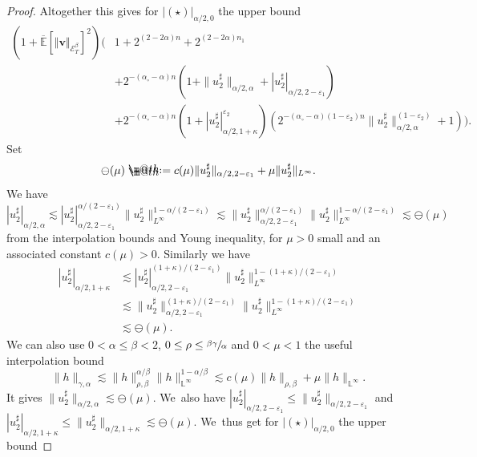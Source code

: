 \documentclass[JEP,XML,SOM,Unicode,published]{cedram}
\makeatletter
\theoremstyle{definition}
\let\epsilon\varepsilon
\newcommand\bbE{\mathbb{E}}
\newcommand{\mcE}{\mathcal{E}}
\newcommand{\bsv}{\boldsymbol{v}}
\newcommand*{\defeq}{\mathrel{\rlap{%
\raisebox{0.3ex}{$\m@th\cdot$}}%
\raisebox{-0.3ex}{$\m@th\cdot$}}%
=}
\newcommand{\norme}[1]{\Vert #1 \Vert}
\makeatother
\begin{document}
\begin{proof}
Altogether this gives for $| (\star) |_{\alpha / 2, 0}$ the upper bound
\begin{align*}
(1+ \overline{\bbE}[\norme{\bsv}_{\mcE^\beta_T}]^2)\bigl( &1 + 2^{(2 - 2 \alpha) n} + 2^{(2 - 2 \alpha) n_1}
\\
& + 2^{- (\alpha_{\circ} - \alpha) n} (1 + \| u^{\sharp}_2 \|_{\alpha
/ 2, \alpha} + | u_2^{\sharp} |_{\alpha / 2, 2 - \epsilon_1})
\\
& + 2^{- (\alpha_{\circ} - \alpha) n} (1 + |
u_2^{\sharp} |^{\epsilon_2}_{\alpha / 2, 1 + \kappa}) (2^{-
(\alpha_{\circ} - \alpha) (1 - \epsilon_2) n} \| u_2^{\sharp} \|^{(1 -
\epsilon_2)}_{\alpha / 2, \alpha} + 1) \bigr).
\end{align*}
Set
\[
\ominus (\mu) \defeq c (\mu) \| u_2^{\sharp} \|_{\alpha / 2, 2 -
\epsilon_1} + \mu \| u_2^{\sharp} \|_{L^{\infty}}.
\]
We have
\[
| u_2^{\sharp} |_{\alpha / 2, \alpha} \lesssim | u_2^{\sharp} |_{\alpha /
2, 2 - \epsilon_1}^{\alpha / (2 - \epsilon_1)} \| u_2^{\sharp}
\|_{L^{\infty}}^{1 - \alpha / (2 - \epsilon_1)}\lesssim \|
u_2^{\sharp} \|_{\alpha / 2, 2 - \epsilon_1}^{\alpha / (2 - \epsilon_1)}
\| u_2^{\sharp} \|_{L^{\infty}}^{1 - \alpha / (2 - \epsilon_1)} \lesssim
\ominus (\mu)
\]
from the interpolation bounds and Young inequality, for $\mu > 0$ small and an associated constant $c (\mu) > 0$. Similarly we have
\begin{equation*} \begin{split}
| u_2^{\sharp} |_{\alpha / 2, 1 + \kappa} &\lesssim
| u_2^{\sharp} |_{\alpha / 2, 2 - \epsilon_1}^{(1 + \kappa) / (2 -
\epsilon_1)} \| u_2^{\sharp} \|_{L^{\infty}}^{1 - (1 + \kappa) / (2 -
\epsilon_1)} \\
&\lesssim \| u_2^{\sharp} \|_{\alpha / 2, 2 -
\epsilon_1}^{(1 + \kappa) / (2 - \epsilon_1)} \| u_2^{\sharp}
\|_{L^{\infty}}^{1 - (1 + \kappa) / (2 - \epsilon_1)} \\
&\lesssim \ominus (\mu).
\end{split} \end{equation*}
We can also use $0 < \alpha \leq \beta < 2$, $0 \leq \rho \leq \sfrac{\beta \gamma}{\alpha}$ and $0 < \mu < 1$ the useful interpolation bound
\[
\| h \|_{\gamma, \alpha} \lesssim \| h \|_{\rho, \beta}^{\alpha / \beta} \|
h \|_{\mathbb{L}^{\infty}}^{1 - \alpha / \beta} \lesssim c (\mu) \| h
\|_{\rho, \beta} + \mu \| h \|_{\mathbb{L}^{\infty}}.
\]
It gives $\| u_2^{\sharp} \|_{\alpha / 2, \alpha} \lesssim \ominus (\mu)$. We~also have $| u_2^{\sharp} |_{\alpha / 2, 2 - \epsilon_1} \leq \| u_2^{\sharp} \|_{\alpha / 2, 2 - \epsilon_1}$ and $| u_2^{\sharp} |_{\alpha / 2, 1 + \kappa} \leq \| u_2^{\sharp} \|_{\alpha / 2, 1 + \kappa} \lesssim \ominus (\mu)$. We~thus get for $| (\star) |_{\alpha / 2, 0}$ the upper bound

\end{proof}
\end{document}
